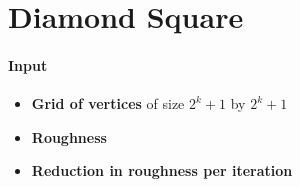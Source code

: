 \section{Diamond Square}

\paragraph{Input}
\begin{itemize}
  \item \textbf{Grid of vertices} of size $ 2^{k} + 1 $ by $ 2^{k} + 1 $
  \item \textbf{Roughness}
  \item \textbf{Reduction in roughness per iteration}
\end{itemize}
